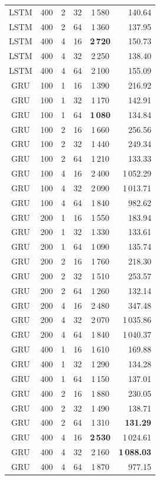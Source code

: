 \documentclass{article}
\begin{document}
\begin{itemize}
\begin{longtable}{cccccr}
        LSTM & 400 & 2 & 32 & 1\,580 & 140.64 \\
        LSTM & 400 & 2 & 64 & 1\,360 & 137.95 \\
        LSTM & 400 & 4 & 16 & \textbf{2\,720} & 150.73 \\
        LSTM & 400 & 4 & 32 & 2\,250 & 138.40 \\
        LSTM & 400 & 4 & 64 & 2\,100 & 155.09 \\
        \midrule
        \midrule
        GRU & 100 & 1 & 16 & 1\,390 & 216.92 \\
        GRU & 100 & 1 & 32 & 1\,170 & 142.91 \\
        GRU & 100 & 1 & 64 & \textbf{1\,080} & 134.84 \\
        GRU & 100 & 2 & 16 & 1\,660 & 256.56 \\
        GRU & 100 & 2 & 32 & 1\,440 & 249.34 \\
        GRU & 100 & 2 & 64 & 1\,210 & 133.33 \\
        GRU & 100 & 4 & 16 & 2\,400 & 1\,052.29 \\
        GRU & 100 & 4 & 32 & 2\,090 & 1\,013.71 \\
        GRU & 100 & 4 & 64 & 1\,840 & 982.62 \\
        \midrule
        GRU & 200 & 1 & 16 & 1\,550 & 183.94 \\
        GRU & 200 & 1 & 32 & 1\,330 & 133.61 \\
        GRU & 200 & 1 & 64 & 1\,090 & 135.74 \\
        GRU & 200 & 2 & 16 & 1\,760 & 218.30 \\
        GRU & 200 & 2 & 32 & 1\,510 & 253.57 \\
        GRU & 200 & 2 & 64 & 1\,260 & 132.14 \\
        GRU & 200 & 4 & 16 & 2\,480 & 347.48 \\
        GRU & 200 & 4 & 32 & 2\,070 & 1\,035.86 \\
        GRU & 200 & 4 & 64 & 1\,840 & 1\,040.37 \\
        \midrule
        GRU & 400 & 1 & 16 & 1\,610 & 169.88 \\
        GRU & 400 & 1 & 32 & 1\,290 & 134.28 \\
        GRU & 400 & 1 & 64 & 1\,150 & 137.01 \\
        GRU & 400 & 2 & 16 & 1\,880 & 230.05 \\
        GRU & 400 & 2 & 32 & 1\,490 & 138.71 \\
        GRU & 400 & 2 & 64 & 1\,310 & \textbf{131.29} \\
        GRU & 400 & 4 & 16 & \textbf{2\,530} & 1\,024.61 \\
        GRU & 400 & 4 & 32 & 2\,160 & \textbf{1\,088.03} \\
        GRU & 400 & 4 & 64 & 1\,870 & 977.15 \\
		\bottomrule
	\end{longtable}
    

\end{itemize}
\end{document}
